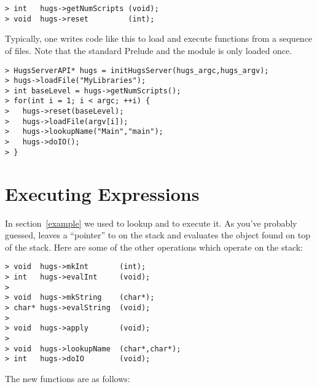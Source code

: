 \begin{verbatim}
> int   hugs->getNumScripts (void);
> void  hugs->reset         (int);
\end{verbatim}

Typically, one writes code like this to load and execute functions
from a sequence of files.  Note that the standard Prelude and 
the module  is only loaded once.

\begin{verbatim}
> HugsServerAPI* hugs = initHugsServer(hugs_argc,hugs_argv);
> hugs->loadFile("MyLibraries");
> int baseLevel = hugs->getNumScripts();
> for(int i = 1; i < argc; ++i) {
>   hugs->reset(baseLevel);
>   hugs->loadFile(argv[i]);                                       
>   hugs->lookupName("Main","main");                               
>   hugs->doIO();
> }
\end{verbatim}


\section{Executing Expressions}\label{evaluating}

In section~\ref{example} we used  to lookup
 and  to execute it.  As you've probably
guessed,  leaves a ``pointer'' to  on
the stack and  evaluates the object found on top of the stack.
Here are some of the other operations which operate on the stack:

\begin{verbatim}
> void  hugs->mkInt       (int);
> int   hugs->evalInt     (void);     
> 
> void  hugs->mkString    (char*);
> char* hugs->evalString  (void);	 
> 
> void  hugs->apply       (void);     
> 
> void  hugs->lookupName  (char*,char*);
> int   hugs->doIO        (void);	 
\end{verbatim}

The new functions are as follows:


